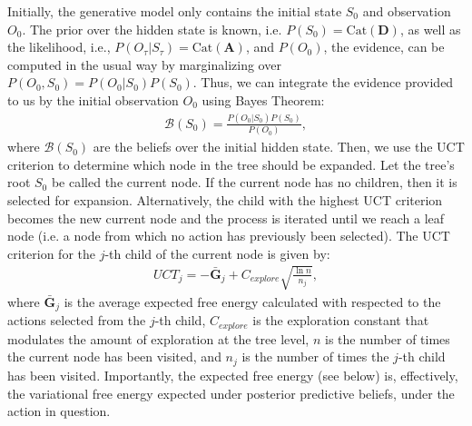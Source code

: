 \documentclass[twoside,11pt]{article}
\begin{document}
Initially, the generative model only contains the initial state $S_0$ and observation $O_0$. The prior over the hidden state is known, i.e. $P(S_0) = \text{Cat}(\bm{D})$, as well as the likelihood, i.e., $P(O_\tau|S_\tau) = \text{Cat}(\bm{A})$, and $P(O_0)$, the evidence, can be computed in the usual way by marginalizing over $P(O_0,S_0) = P(O_0|S_0)P(S_0)$. Thus, we can integrate the evidence provided to us by the initial observation $O_0$ using Bayes Theorem:
\begin{align}\label{eq:initial_beliefs}
\mathcal{B}(S_0) = \frac{P(O_0|S_0)P(S_0)}{P(O_0)},
\end{align}
where $\mathcal{B}(S_0)$ are the beliefs over the initial hidden state. Then, we use the UCT criterion to determine which node in the tree should be expanded. Let the tree's root $S_0$ be called the current node. If the current node has no children, then it is selected for expansion. Alternatively, the child with the highest UCT criterion becomes the new current node and the process is iterated until we reach a leaf node (i.e. a node from which no action has previously been selected). The UCT criterion \citep{6145622} for the $j$-th child of the current node is given by:
\begin{align}\label{eq:UCT}
UCT_j = - \bar{\bm{G}}_j + C_{explore} \sqrt{\frac{\ln n}{n_j}},
\end{align}
where $\bar{\bm{G}}_j$ is the average expected free energy calculated with respected to the actions selected from the $j$-th child, $C_{explore}$ is the exploration constant that modulates the amount of exploration at the tree level, $n$ is the number of times the current node has been visited, and $n_j$ is the number of times the $j$-th child has been visited. Importantly, the expected free energy (see below) is, effectively, the variational free energy expected under posterior predictive beliefs, under the action in question.
\end{document}
